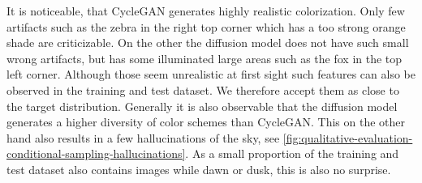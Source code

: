 It is noticeable, that CycleGAN generates highly realistic colorization.
Only few artifacts such as the zebra in the right top corner which has a too strong orange shade are criticizable.
On the other the diffusion model does not have such small wrong artifacts, but has some illuminated large areas such as the fox in the top left corner.
Although those seem unrealistic at first sight such features can also be observed in the training and test dataset.
We therefore accept them as close to the target distribution.
Generally it is also observable that the diffusion model generates a higher diversity of color schemes than CycleGAN.
This on the other hand also results in a few hallucinations of the sky, see \autoref{fig:qualitative-evaluation-conditional-sampling-hallucinations}.
As a small proportion of the training and test dataset also contains images while dawn or dusk, this is also no surprise.

